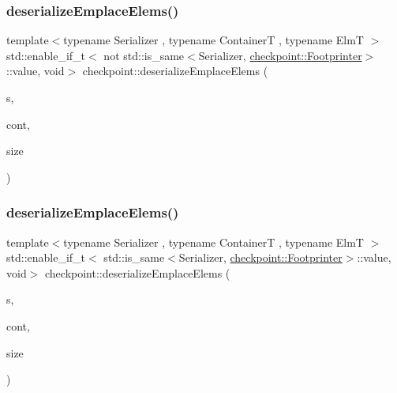 \subsubsection{\texorpdfstring{deserialize\+Emplace\+Elems()}{deserializeEmplaceElems()}\hspace{0.1cm}{\footnotesize\ttfamily [1/2]}}
{\footnotesize\ttfamily template$<$typename Serializer , typename ContainerT , typename ElmT $>$ \\
std\+::enable\+\_\+if\+\_\+t$<$ not std\+::is\+\_\+same$<$Serializer, \hyperlink{structcheckpoint_1_1_footprinter}{checkpoint\+::\+Footprinter}$>$\+::value, void$>$ checkpoint\+::deserialize\+Emplace\+Elems (\begin{DoxyParamCaption}\item[{Serializer \&}]{s,  }\item[{ContainerT \&}]{cont,  }\item[{typename Container\+T\+::size\+\_\+type}]{size }\end{DoxyParamCaption})\hspace{0.3cm}{\ttfamily [inline]}}

\mbox{\label{namespacecheckpoint_a811956d461a3ebc7329272fd33e1084f}} 
\subsubsection{\texorpdfstring{deserialize\+Emplace\+Elems()}{deserializeEmplaceElems()}\hspace{0.1cm}{\footnotesize\ttfamily [2/2]}}
{\footnotesize\ttfamily template$<$typename Serializer , typename ContainerT , typename ElmT $>$ \\
std\+::enable\+\_\+if\+\_\+t$<$ std\+::is\+\_\+same$<$Serializer, \hyperlink{structcheckpoint_1_1_footprinter}{checkpoint\+::\+Footprinter}$>$\+::value, void$>$ checkpoint\+::deserialize\+Emplace\+Elems (\begin{DoxyParamCaption}\item[{Serializer \&}]{s,  }\item[{ContainerT \&}]{cont,  }\item[{typename Container\+T\+::size\+\_\+type}]{size }\end{DoxyParamCaption})\hspace{0.3cm}{\ttfamily [inline]}}

